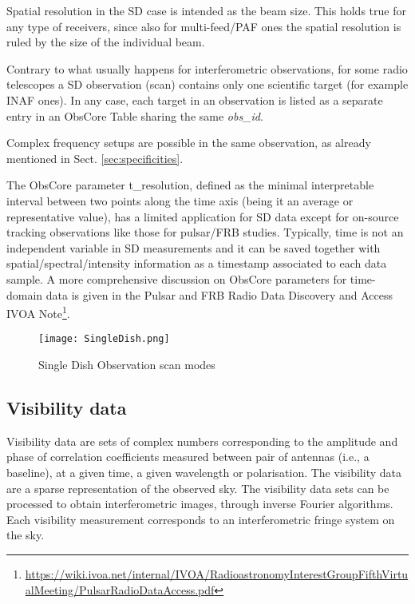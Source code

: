 \documentclass[11pt,a4paper]{ivoa}
\begin{document}
Spatial resolution in the SD case is intended as the beam size. This holds true for any type of receivers, since also for multi-feed/PAF ones the spatial resolution is ruled by the size of the individual beam.

Contrary to what usually happens for  interferometric observations, for some radio telescopes a SD observation (scan) contains only one scientific target (for example INAF ones). In any case, each target in an observation is listed as a separate entry in an ObsCore Table sharing the same \emph{obs\_id}.

Complex frequency setups are possible in the same observation, as already mentioned in Sect. \ref{sec:specificities}.

The ObsCore parameter t\_resolution, defined as the minimal interpretable interval between two points along the
time axis (being it an average or representative value), has a limited application for SD data except for on-source tracking
observations like those for pulsar/FRB studies.
Typically, time is not an independent variable in SD measurements and it can be saved together with spatial/spectral/intensity
information as a timestamp associated to each data sample.
A more comprehensive discussion on ObsCore parameters for time-domain data is given in the Pulsar
and FRB Radio Data Discovery and Access IVOA Note\footnote{\url{https://wiki.ivoa.net/internal/IVOA/RadioastronomyInterestGroupFifthVirtualMeeting/PulsarRadioDataAccess.pdf}}.




\begin{figure}[H]
\centering

\texttt{[image: SingleDish.png]}
\caption{Single Dish Observation scan modes}
\label{fig:SD}
\end{figure}



\subsection{Visibility data }
\label{sec:visibility}

Visibility data are sets of complex numbers corresponding to the amplitude and phase
of correlation coefficients measured between pair of antennas (i.e., a baseline), at
a given time, a given wavelength or polarisation. The visibility data are a sparse
representation of the observed sky. The visibility data sets can be processed to obtain
interferometric images, through inverse Fourier algorithms. Each visibility measurement
corresponds to an interferometric fringe system on the sky.
\end{document}
